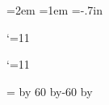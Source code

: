 \newtheorem{crl}{Corollary of Conjecture~4.1}


%
\marginparwidth=24pt \headsep=2em \headheight=1em
\textheight=8.7in \hoffset=-.7in \textwidth=6.5in




\catcode`\@=11

\newif\if@fewtab\@fewtabtrue


\catcode`\@=11

\newif\if@fewtab\@fewtabtrue

{=\time\divide{} by 60
\xdef\hourmin{\number\count255} \multiply{}
by-60\advance{} by\time
\xdef\hourmin{\hourmin:\ifnum\count255<10 0\fi\the\count255}}
\def\ps@draft{\let\@mkboth\@gobbletwo
    \def\@oddhead{}
    \def\@oddfoot
      {\hbox to 7 cm{\footnotesize {\em Draft of \jobname:} \draftdate
       \hfil}\hskip -7cm\hfil\rm\thepage \hfil}
    \def\@evenhead{}\let\@evenfoot\@oddfoot}


\def\ceqno{\global\@fewtabfalse
    \ifcase\@eqcnt \def\@tempa{& & &}\or \def\@tempa{& &}
      \or \def\@tempa{&}
      \or\def\@tempa{}\fi\@tempa
{\rm(\theequation)}}

\def\aeqno#1{\global\@fewtabfalse
    \ifcase\@eqcnt \def\@tempa{& & &}\or \def\@tempa{& &}
      \or \def\@tempa{&}
      \or\def\@tempa{}\fi\@tempa
{\rm(\theequation,#1)}}

\def\label#1{\ifnum\draftcontrol=1
 \global\def\draftnote{$\scriptstyle #1$}\fi
 \@bsphack\if@filesw {\let\thepage\relax
   \def\protect{\noexpand\noexpand\noexpand}%
\xdef\@gtempa{\write\@auxout{\string
      \newlabel{#1}{{\@currentlabel}{\thepage}}}}}\@gtempa
   \if@nobreak \ifvmode\nobreak\fi\fi\fi
  \@esphack}

\def\alabel#1#2{\label{#1}\global\@fewtabfalse
    \ifcase\@eqcnt \def\@tempa{& & &}\or \def\@tempa{& &}
      \or \def\@tempa{&}
      \or\def\@tempa{}\fi\@tempa
{\hbox to 3cm{\phantom{\rm(\theequation,#2)} \draftnote
\hfil}\hskip -3cm {\rm(\theequation,#2)}}}

